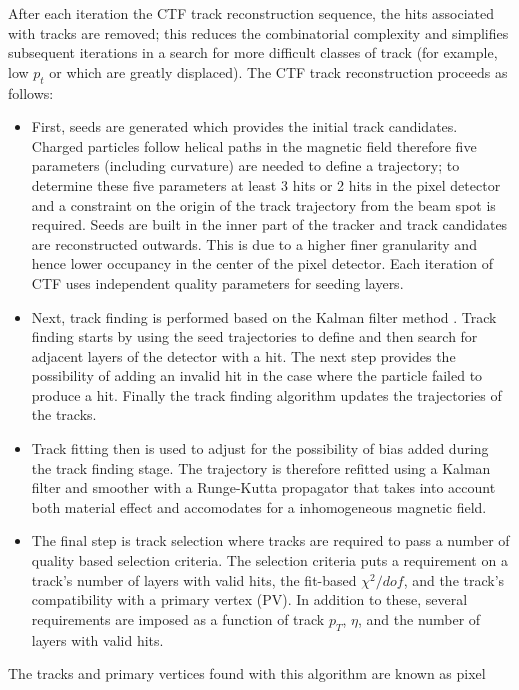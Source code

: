 After each iteration the CTF track reconstruction sequence, the hits
associated with tracks are removed; this reduces the combinatorial complexity
and simplifies subsequent iterations in a search for more difficult classes of track (for example,
low $p_{t}$ or which are greatly displaced).
The CTF track reconstruction proceeds as follows:
\begin{itemize}
\item First, seeds are generated which provides the initial track candidates.
Charged particles follow helical paths in the magnetic field therefore five parameters (including curvature)
are needed to define a trajectory; to determine these five parameters at least
3 hits or 2 hits in the pixel detector and a constraint on the origin of the track trajectory from the beam
spot is required. Seeds are built in the inner part of the tracker
and track candidates are reconstructed outwards. This is due to a higher finer granularity 
and hence lower occupancy in the center of the pixel detector. Each iteration of CTF
uses independent quality parameters for seeding layers. 
\item Next, track finding is performed based on the Kalman filter method \cite{KalmanFilter}.
Track finding starts by using the seed trajectories to define and then search
for adjacent layers of the detector with a hit. The next step provides the possibility
of adding an invalid hit in the case where the particle failed to produce a hit.
Finally the track finding algorithm updates the trajectories of the tracks. 
\item Track fitting then is used to adjust for the possibility of bias added during the track
finding stage. The trajectory is therefore refitted using a Kalman filter and smoother with
a Runge-Kutta propagator that takes into account both material effect and accomodates
for a inhomogeneous magnetic field.
\item The final step is track selection where tracks are required to pass a number of quality
based selection criteria. 
The selection criteria puts a requirement on a track's number of layers %
with valid hits, the fit-based $\chi^{2}/dof$, and the track's compatibility
with a primary vertex (PV). In addition to these, several requirements are
imposed as a function of track $p_{T}$, $\eta$, and the number of layers
with valid hits. 
\end{itemize}
The tracks and primary vertices found with this algorithm are known as pixel 
